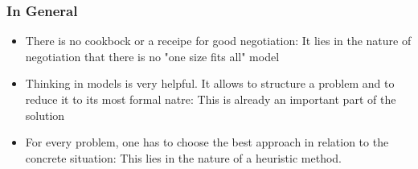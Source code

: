 \subsubsection{In General}

\begin{itemize}
    \item There is no cookbock or a receipe for good negotiation: It lies in the
        nature of negotiation that there is no "one size fits all" model
    \item Thinking in models is very helpful. It allows to structure a problem
        and to reduce it to its most formal natre: This is already an important
        part of the solution
    \item For every problem, one has to choose the best approach in relation to
        the concrete situation: This lies in the nature of a heuristic method.
\end{itemize}

